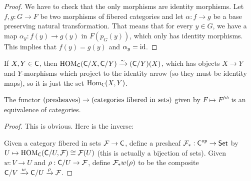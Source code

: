  \begin{proof}
   We have to check that the only morphisms are identity morphisms. Let $f,g:G\to F$ be
   two morphisms of fibered categories and let $\alpha:f\to g$ be a base preserving
   natural transformation. That means that for every $y\in G$, we have a map
   $\alpha_y:f(y)\to g(y)$ in $F(p_G(y))$, which only has identity morphisms. This
   implies that $f(y)=g(y)$ and $\alpha_y=\operatorname{id}$.
 \end{proof}
 \begin{corollary}
   If $X,Y\in \text{\sf C}$, then $\operatorname{HOM}_{\text{\sf C}}(\text{\sf C}/X,\text{\sf C}/Y)\xrightarrow\sim (\text{\sf C}/Y)(X)$, which has objects
   $X\to Y$ and $Y$-morphisms which project to the identity arrow (so they must be
   identity maps), so it is just the set $\operatorname{Hom}_{\text{\sf C}}(X,Y)$.
 \end{corollary}
 \begin{proposition}\label{lec22P:presh<=>fibered_in_sets}
   The functor $(\text{\rm presheaves})\to (\text{\rm categories fibered in sets})$ given by
   $F\mapsto F^{fib}$ is an equivalence of categories.
 \end{proposition}
 \begin{proof}
   This is obvious. Here is the inverse:

   Given a category fibered in sets $\mathcal{F}\to \text{\sf C}$, define a presheaf $\mathcal{F}_*:\text{\sf C}^{op}\to \text{\sf Set}$
   by $U\mapsto \operatorname{HOM}_{\text{\sf C}}(\text{\sf C}/U,\mathcal{F})\cong \mathcal{F}(U)$ (this is actually a bijection of sets).
   Given $w:V\to U$ and $\rho:\text{\sf C}/U\to \mathcal{F}$, define $\mathcal{F}_* w(\rho)$ to be the composite
   $\text{\sf C}/V\xrightarrow w \text{\sf C}/U \xrightarrow\rho \mathcal{F}$.
 \end{proof}
